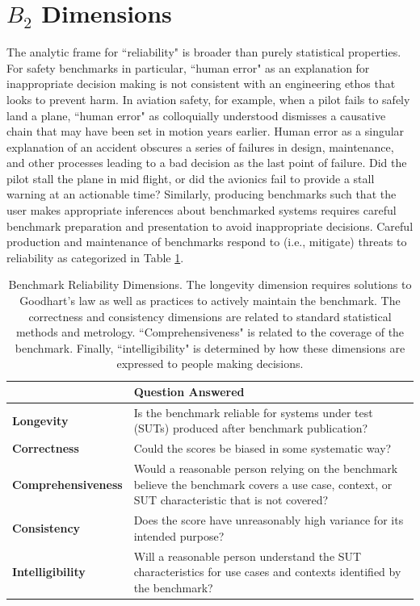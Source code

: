 \documentclass{article}
\newcommand\bb{$B_2$ }
\begin{document}
\section{\texorpdfstring{\bb}{B2} Dimensions}
The analytic frame for ``reliability" is broader than purely statistical properties. For safety benchmarks in particular, ``human error" as an explanation for inappropriate decision making is not consistent with an engineering ethos that looks to prevent harm. In aviation safety, for example, when a pilot fails to safely land a plane, ``human error" as colloquially understood dismisses a causative chain that may have been set in motion years earlier. Human error as a singular explanation of an accident obscures a series of failures in design, maintenance, and other processes leading to a bad decision as the last point of failure. Did the pilot stall the plane in mid flight, or did the avionics fail to provide a stall warning at an actionable time? Similarly, producing benchmarks such that the user makes appropriate inferences about benchmarked systems requires careful benchmark preparation and presentation to avoid inappropriate decisions. Careful production and maintenance of benchmarks respond to (i.e., mitigate) threats to reliability as categorized in Table \ref{tab:dimensions}.

\begin{table}[h!]
  \caption{Benchmark Reliability Dimensions. The longevity dimension requires solutions to Goodhart's law as well as practices to actively maintain the benchmark. The correctness and consistency dimensions are related to standard statistical methods and metrology. ``Comprehensiveness" is related to the coverage of the benchmark. Finally, ``intelligibility" is determined by how these dimensions are expressed to people making decisions.}
  \label{tab:benchmark-reliability-dimensions}
\label{tab:dimensions}
  \centering
  \begin{tabular}{lp{10cm}}
    \toprule
    & \textbf{Question Answered} \\
    \midrule
    \textbf{Longevity} & Is the benchmark reliable for systems under test (SUTs) produced after benchmark publication? \\
    \textbf{Correctness} & Could the scores be biased in some systematic way? \\
    \textbf{Comprehensiveness} & Would a reasonable person relying on the benchmark believe the benchmark covers a use case, context, or SUT characteristic that is not covered? \\
    \textbf{Consistency} & Does the score have unreasonably high variance for its intended purpose? \\
    \textbf{Intelligibility} & Will a reasonable person understand the SUT characteristics for use cases and contexts identified by the benchmark? \\
    \bottomrule
  \end{tabular}
\end{table}
\end{document}
